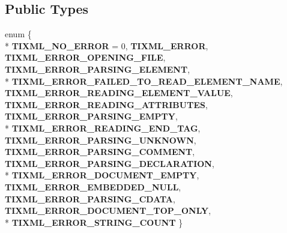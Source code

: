 \subsection*{Public Types}
\begin{DoxyCompactItemize}
\item 
\hypertarget{class_ti_xml_base_a9a7e9344415956ab96e8c75f6a0bbd48}{enum \{ \\*
{\bfseries T\+I\+X\+M\+L\+\_\+\+N\+O\+\_\+\+E\+R\+R\+O\+R} = 0, 
{\bfseries T\+I\+X\+M\+L\+\_\+\+E\+R\+R\+O\+R}, 
{\bfseries T\+I\+X\+M\+L\+\_\+\+E\+R\+R\+O\+R\+\_\+\+O\+P\+E\+N\+I\+N\+G\+\_\+\+F\+I\+L\+E}, 
{\bfseries T\+I\+X\+M\+L\+\_\+\+E\+R\+R\+O\+R\+\_\+\+P\+A\+R\+S\+I\+N\+G\+\_\+\+E\+L\+E\+M\+E\+N\+T}, 
\\*
{\bfseries T\+I\+X\+M\+L\+\_\+\+E\+R\+R\+O\+R\+\_\+\+F\+A\+I\+L\+E\+D\+\_\+\+T\+O\+\_\+\+R\+E\+A\+D\+\_\+\+E\+L\+E\+M\+E\+N\+T\+\_\+\+N\+A\+M\+E}, 
{\bfseries T\+I\+X\+M\+L\+\_\+\+E\+R\+R\+O\+R\+\_\+\+R\+E\+A\+D\+I\+N\+G\+\_\+\+E\+L\+E\+M\+E\+N\+T\+\_\+\+V\+A\+L\+U\+E}, 
{\bfseries T\+I\+X\+M\+L\+\_\+\+E\+R\+R\+O\+R\+\_\+\+R\+E\+A\+D\+I\+N\+G\+\_\+\+A\+T\+T\+R\+I\+B\+U\+T\+E\+S}, 
{\bfseries T\+I\+X\+M\+L\+\_\+\+E\+R\+R\+O\+R\+\_\+\+P\+A\+R\+S\+I\+N\+G\+\_\+\+E\+M\+P\+T\+Y}, 
\\*
{\bfseries T\+I\+X\+M\+L\+\_\+\+E\+R\+R\+O\+R\+\_\+\+R\+E\+A\+D\+I\+N\+G\+\_\+\+E\+N\+D\+\_\+\+T\+A\+G}, 
{\bfseries T\+I\+X\+M\+L\+\_\+\+E\+R\+R\+O\+R\+\_\+\+P\+A\+R\+S\+I\+N\+G\+\_\+\+U\+N\+K\+N\+O\+W\+N}, 
{\bfseries T\+I\+X\+M\+L\+\_\+\+E\+R\+R\+O\+R\+\_\+\+P\+A\+R\+S\+I\+N\+G\+\_\+\+C\+O\+M\+M\+E\+N\+T}, 
{\bfseries T\+I\+X\+M\+L\+\_\+\+E\+R\+R\+O\+R\+\_\+\+P\+A\+R\+S\+I\+N\+G\+\_\+\+D\+E\+C\+L\+A\+R\+A\+T\+I\+O\+N}, 
\\*
{\bfseries T\+I\+X\+M\+L\+\_\+\+E\+R\+R\+O\+R\+\_\+\+D\+O\+C\+U\+M\+E\+N\+T\+\_\+\+E\+M\+P\+T\+Y}, 
{\bfseries T\+I\+X\+M\+L\+\_\+\+E\+R\+R\+O\+R\+\_\+\+E\+M\+B\+E\+D\+D\+E\+D\+\_\+\+N\+U\+L\+L}, 
{\bfseries T\+I\+X\+M\+L\+\_\+\+E\+R\+R\+O\+R\+\_\+\+P\+A\+R\+S\+I\+N\+G\+\_\+\+C\+D\+A\+T\+A}, 
{\bfseries T\+I\+X\+M\+L\+\_\+\+E\+R\+R\+O\+R\+\_\+\+D\+O\+C\+U\+M\+E\+N\+T\+\_\+\+T\+O\+P\+\_\+\+O\+N\+L\+Y}, 
\\*
{\bfseries T\+I\+X\+M\+L\+\_\+\+E\+R\+R\+O\+R\+\_\+\+S\+T\+R\+I\+N\+G\+\_\+\+C\+O\+U\+N\+T}
 \}}\label{class_ti_xml_base_a9a7e9344415956ab96e8c75f6a0bbd48}

\end{DoxyCompactItemize}
